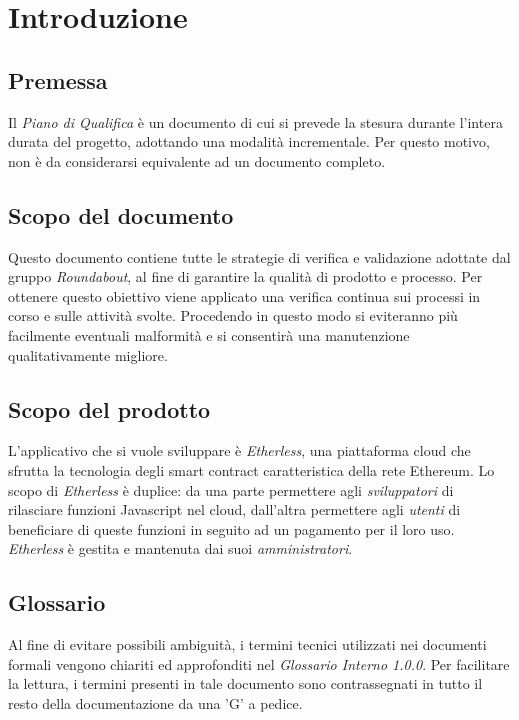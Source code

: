 \section{Introduzione}

\subsection{Premessa}
	Il \textit{Piano di Qualifica} è un documento di cui si prevede la stesura durante l'intera durata del progetto, adottando una modalità incrementale. Per questo motivo, non è da considerarsi equivalente ad un documento completo.


\subsection{Scopo del documento}
	Questo documento contiene tutte le strategie di verifica e validazione adottate dal gruppo \textit{Roundabout}, al fine di garantire la qualità di prodotto e processo. Per ottenere questo obiettivo viene applicato una verifica continua sui processi in corso e sulle attività svolte. Procedendo in questo modo si eviteranno più facilmente eventuali malformità e si consentirà una manutenzione qualitativamente migliore.


\subsection{Scopo del prodotto}
	L'applicativo che si vuole sviluppare è \textit{Etherless}, una piattaforma cloud che sfrutta la tecnologia
	degli smart contract caratteristica della rete Ethereum. Lo scopo di \textit{Etherless} è duplice: da una
	parte permettere agli \textit{sviluppatori} di rilasciare funzioni Javascript nel cloud, dall'altra
	permettere agli \textit{utenti} di beneficiare di queste funzioni in seguito ad un pagamento per il loro
	uso. \textit{Etherless} è gestita e mantenuta dai suoi \textit{amministratori}.


\subsection{Glossario}
	Al fine di evitare possibili ambiguità, i termini tecnici utilizzati nei documenti formali vengono
	chiariti ed approfonditi nel \textit{Glossario Interno 1.0.0}. Per facilitare la lettura, i termini presenti in
	tale documento sono contrassegnati in tutto il resto della documentazione da una 'G' a pedice.

